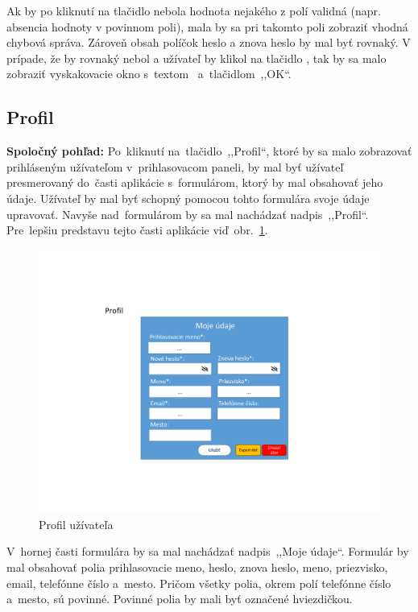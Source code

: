 Ak by po kliknutí na tlačidlo  nebola hodnota nejakého z polí validná (napr. absencia hodnoty v povinnom poli), mala by sa pri takomto poli zobraziť vhodná chybová správa. Zároveň obsah políčok heslo a znova heslo by mal byť rovnaký. V prípade, že by rovnaký nebol a užívateľ by klikol na tlačidlo , tak by sa malo zobraziť vyskakovacie okno s~textom~ a~tlačidlom~,,OK``.

\subsection{Profil}
\label{profil}

\textbf{Spoločný pohľad:} Po~kliknutí na~tlačidlo~,,Profil``, ktoré by sa malo zobrazovať prihláseným užívateľom v~prihlasovacom paneli, by mal byť užívateľ presmerovaný do~časti aplikácie s~formulárom, ktorý by mal obsahovať jeho údaje. Užívateľ by mal byť schopný pomocou tohto formulára svoje údaje upravovať. Navyše nad~formulárom by sa mal nachádzať nadpis~,,Profil``. Pre~lepšiu predstavu tejto časti aplikácie viď~obr.~\ref{profile}.

\begin{figure}[H]\centering
\includegraphics[width=140mm]{../img/UI concept/profile}
\caption{Profil užívateľa}
\label{profile}
\end{figure}

V~hornej časti formulára by sa mal nachádzať nadpis~,,Moje údaje``. Formulár by mal obsahovať polia prihlasovacie meno, heslo, znova heslo, meno, priezvisko, email, telefónne číslo a~mesto. Pričom všetky polia, okrem polí telefónne číslo a~mesto, sú povinné. Povinné polia by mali byť označené hviezdičkou.

